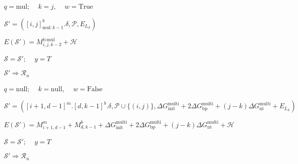 \begin{algorithm}
\begin{algorithmic}[1]
		
		\State $q = \text{mul}$; \ \ $k = j$, \ \ $w= \mathrm{True}$
		\EndIf	
		
		
		\State $\mathcal{S}' = ([i,j]^b_{\text{mul}:k-1}.\delta, \mathcal{P}, E_{L_{\mathcal{S}}})$ 
		
		\State $E(\mathcal{S}')  = M_{i,j,k-2}^\text{b:mul} + \mathcal{H}$
		
		
		
		
		\State $\mathcal{S} = \mathcal{S}'$; \ \  $y = T$
		
		\Else
		
		\State $\mathcal{S}' \Rightarrow \mathcal{R}_u$		
		\EndIf
		
		\EndIf
		
		\EndIf
		\State $q = \text{null}$; \ \ $k = \text{null}$, \ \ $w= \mathrm{False}$ 
		\EndIf	
		
		
		
		
		
		\State  $\mathcal{S}' = ([i+1,d-1]^m.[d,k-1]^b.\delta, \mathcal{P} \cup \{(i,j)\}, \Delta G_\text{init}^\text{multi} + 2\Delta G_\text{bp}^\text{multi} + (j-k) \Delta G_\text{nt}^\text{multi} + E_{L_{\mathcal{S}}})$
		
		\State $E(\mathcal{S}')  = M^m_{i+1,d-1} + M^b_{d,k-1} + \Delta G_\text{init}^\text{multi} + 2\Delta G_\text{bp}^\text{multi} + (j-k)\Delta G_\text{nt}^\text{multi} + \mathcal{H}$
		
		
		
		
		\State $\mathcal{S} = \mathcal{S}'$; \ \  $y = T$
		
		\Else
		
		\State $\mathcal{S}' \Rightarrow \mathcal{R}_u$		
		\EndIf
		
		
		\EndIf
		\EndFor
		\EndIf
		
		
		
		
		
	\end{algorithmic}
\end{algorithm}



